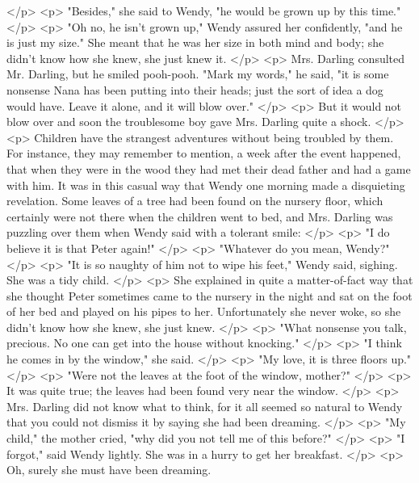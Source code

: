     </p>
    <p>
      "Besides," she said to Wendy, "he would be grown up by this time."
    </p>
    <p>
      "Oh no, he isn't grown up," Wendy assured her confidently, "and he is just
      my size." She meant that he was her size in both mind and body; she didn't
      know how she knew, she just knew it.
    </p>
    <p>
      Mrs. Darling consulted Mr. Darling, but he smiled pooh-pooh. "Mark my
      words," he said, "it is some nonsense Nana has been putting into their
      heads; just the sort of idea a dog would have. Leave it alone, and it will
      blow over."
    </p>
    <p>
      But it would not blow over and soon the troublesome boy gave Mrs. Darling
      quite a shock.
    </p>
    <p>
      Children have the strangest adventures without being troubled by them. For
      instance, they may remember to mention, a week after the event happened,
      that when they were in the wood they had met their dead father and had a
      game with him. It was in this casual way that Wendy one morning made a
      disquieting revelation. Some leaves of a tree had been found on the
      nursery floor, which certainly were not there when the children went to
      bed, and Mrs. Darling was puzzling over them when Wendy said with a
      tolerant smile:
    </p>
    <p>
      "I do believe it is that Peter again!"
    </p>
    <p>
      "Whatever do you mean, Wendy?"
    </p>
    <p>
      "It is so naughty of him not to wipe his feet," Wendy said, sighing. She
      was a tidy child.
    </p>
    <p>
      She explained in quite a matter-of-fact way that she thought Peter
      sometimes came to the nursery in the night and sat on the foot of her bed
      and played on his pipes to her. Unfortunately she never woke, so she
      didn't know how she knew, she just knew.
    </p>
    <p>
      "What nonsense you talk, precious. No one can get into the house without
      knocking."
    </p>
    <p>
      "I think he comes in by the window," she said.
    </p>
    <p>
      "My love, it is three floors up."
    </p>
    <p>
      "Were not the leaves at the foot of the window, mother?"
    </p>
    <p>
      It was quite true; the leaves had been found very near the window.
    </p>
    <p>
      Mrs. Darling did not know what to think, for it all seemed so natural to
      Wendy that you could not dismiss it by saying she had been dreaming.
    </p>
    <p>
      "My child," the mother cried, "why did you not tell me of this before?"
    </p>
    <p>
      "I forgot," said Wendy lightly. She was in a hurry to get her breakfast.
    </p>
    <p>
      Oh, surely she must have been dreaming.
